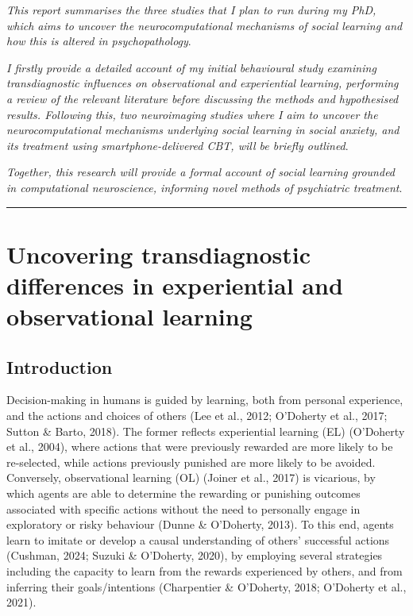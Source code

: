 \documentclass[12pt,a4paper,oneside,]{book} %
\begin{document}
\emph{This report summarises the three studies that I plan to run during my PhD, which aims to uncover the neurocomputational mechanisms of social learning and how this is altered in psychopathology}.

\emph{I firstly provide a detailed account of my initial behavioural study examining transdiagnostic influences on observational and experiential learning, performing a review of the relevant literature before discussing the methods and hypothesised results. Following this, two neuroimaging studies where I aim to uncover the neurocomputational mechanisms underlying social learning in social anxiety, and its treatment using smartphone-delivered CBT, will be briefly outlined}.

\emph{Together, this research will provide a formal account of social learning grounded in computational neuroscience, informing novel methods of psychiatric treatment}.

\begin{center}\rule{0.5\linewidth}{0.5pt}\end{center}

\chapter{Uncovering transdiagnostic differences in experiential and observational learning}\label{uncovering-transdiagnostic-differences-in-experiential-and-observational-learning}

\chaptermark{}

\section{Introduction}\label{introduction-1}

Decision-making in humans is guided by learning, both from personal experience, and the actions and choices of others (Lee et al., 2012; O'Doherty et al., 2017; Sutton \& Barto, 2018). The former reflects experiential learning (EL) (O'Doherty et al., 2004), where actions that were previously rewarded are more likely to be re-selected, while actions previously punished are more likely to be avoided. Conversely, observational learning (OL) (Joiner et al., 2017) is vicarious, by which agents are able to determine the rewarding or punishing outcomes associated with specific actions without the need to personally engage in exploratory or risky behaviour (Dunne \& O'Doherty, 2013). To this end, agents learn to imitate or develop a causal understanding of others' successful actions (Cushman, 2024; Suzuki \& O'Doherty, 2020), by employing several strategies including the capacity to learn from the rewards experienced by others, and from inferring their goals/intentions (Charpentier \& O'Doherty, 2018; O'Doherty et al., 2021).
\end{document}
